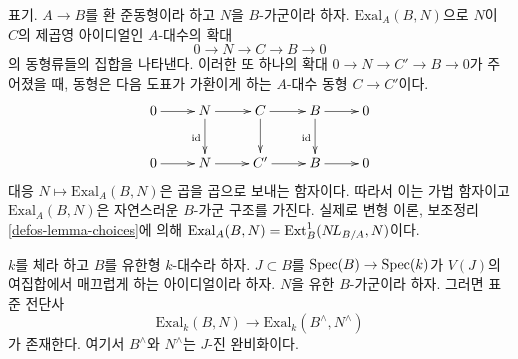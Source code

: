 \noindent
표기. $A \to B$를 환 준동형이라 하고 $N$을 $B$-가군이라 하자.
$\text{Exal}_A(B, N)$으로 $N$이 $C$의 제곱영 아이디얼인 $A$-대수의 확대
$$
0 \to N \to C \to B \to 0
$$
의 동형류들의 집합을 나타낸다. 이러한 또 하나의 확대
$0 \to N \to C' \to B \to 0$가 주어졌을 때, 동형은 다음 도표가
가환이게 하는 $A$-대수 동형 $C \to C'$이다.%
$$
\xymatrix{
0 \ar[r] &
N \ar[r] \ar[d]_{\text{id}} &
C \ar[r] \ar[d] &
B \ar[r] \ar[d]_{\text{id}} & 0 \\
0 \ar[r] &
N \ar[r] &
C' \ar[r] &
B \ar[r] & 0
}
$$
대응 $N \mapsto \text{Exal}_A(B, N)$은 곱을 곱으로 보내는 함자이다.
따라서 이는 가법 함자이고 $\text{Exal}_A(B, N)$은 자연스러운
$B$-가군 구조를 가진다. 실제로 변형 이론, 보조정리
\ref{defos-lemma-choices}에 의해
$\text{Exal}_A(B, N) = \text{Ext}^1_B(\mathop{N\!L}\nolimits_{B/A}, N)$이다.

\begin{lemma}
\label{lemma-first-order-completion}
$k$를 체라 하고 $B$를 유한형 $k$-대수라 하자. $J \subset B$를
$\mathop{\mathrm{Spec}}(B) \to \mathop{\mathrm{Spec}}(k)$가 $V(J)$의 여집합에서 매끄럽게 하는 아이디얼이라
하자. $N$을 유한 $B$-가군이라 하자. 그러면 표준 전단사
$$
\text{Exal}_k(B, N) \to \text{Exal}_k(B^\wedge, N^\wedge)
$$
가 존재한다. 여기서 $B^\wedge$와 $N^\wedge$는 $J$-진 완비화이다.
\end{lemma}

